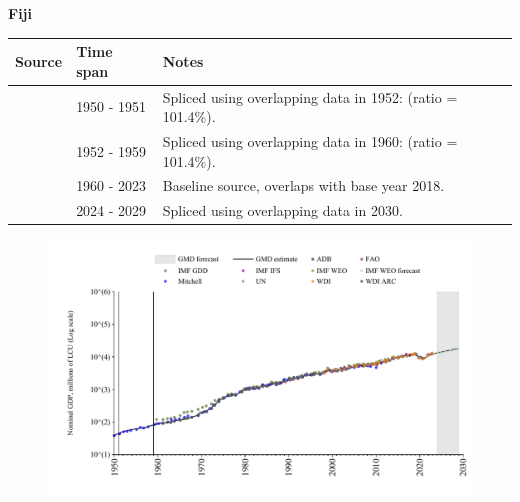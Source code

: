 \documentclass[12pt,a4paper,landscape]{article}
\begin{document}
\begin{adjustbox}{max totalsize={\paperwidth}{\paperheight},center}
\begin{minipage}[t][\textheight][t]{\textwidth}
\vspace*{0.5cm}
{}
\begin{center}
{\Large\bfseries Fiji}
\end{center}
\vspace{0.5cm}
\begin{table}[H]
\centering
\small
\begin{tabular}{|l|l|l|}
\hline
\textbf{Source} & \textbf{Time span} & \textbf{Notes} \\
\hline
\rowcolor{white}\cite{IMF_IFS}& 1950 - 1951 &Spliced using overlapping data in 1952: (ratio = 101.4\%).\\
\rowcolor{lightgray}\cite{Mitchell}& 1952 - 1959 &Spliced using overlapping data in 1960: (ratio = 101.4\%).\\
\rowcolor{white}\cite{WDI}& 1960 - 2023 &Baseline source, overlaps with base year 2018.\\
\rowcolor{lightgray}\cite{IMF_WEO_forecast}& 2024 - 2029 &Spliced using overlapping data in 2030.\\
\hline
\end{tabular}
\end{table}
\begin{figure}[H]
\centering
\includegraphics[width=\textwidth,height=0.6\textheight,keepaspectratio]{graphs/FJI_nGDP.pdf}
\end{figure}
\end{minipage}
\end{adjustbox}
\end{document}
